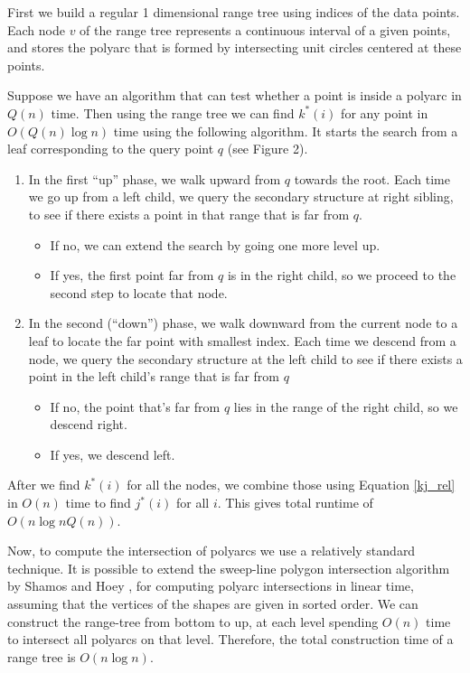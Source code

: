 \documentclass{article}
\begin{document}
First we build a regular 1 dimensional range tree using indices of
the data points. Each node $v$ of the range tree represents a
continuous interval of a given points, and stores the polyarc that
is formed by intersecting unit circles centered at these points.

Suppose we have an algorithm that can test whether a point is inside
a polyarc in $Q(n)$ time. Then using the range tree we can find
$k^*(i)$ for any point in $O(Q(n)\log n)$ time using the following
algorithm. It starts the search from a leaf corresponding to the
query point $q$ (see Figure 2).

\begin{enumerate}[-]
\item
In the first ``up'' phase, we walk upward from $q$ towards the root.
Each time we go up from a left child, we query the secondary structure
at right sibling, to see if there exists a point in that range that
is far from $q$.
\begin{itemize}
\item If no, we can extend the search by going one more level up.
\item If yes, the first point far from $q$ is in the right child,
so we proceed to the second step to locate that node.
\end{itemize}


\item In the second (``down'') phase, we walk downward from the
current node to a leaf to locate the far point with smallest index.
Each time we descend from a node, we query the secondary structure
at the left child to see if there exists a point in the left child's
range that is far from $q$
\begin{itemize}
\item If no, the point that's far from $q$ lies in the range of the
right child, so we descend right.
\item If yes, we descend left.
\end{itemize}
\end{enumerate}

After we find $k^*(i)$ for all the nodes, we combine those using
Equation \ref{kj_rel} in $O(n)$ time to find $j^*(i)$ for all $i$.
This gives total runtime of $O(n \log n Q(n))$.

Now, to compute the intersection of polyarcs we use a relatively
standard technique. It is possible to extend the sweep-line polygon
intersection algorithm by Shamos and Hoey \cite{shamos1976geometric},
for computing polyarc intersections in linear time, assuming that
the vertices of the shapes are given in sorted order. We can construct
the range-tree from bottom to up, at each level spending $O(n)$
time to intersect all polyarcs on that level. Therefore, the total
construction time of a range tree is $O(n \log n)$.
\end{document}

